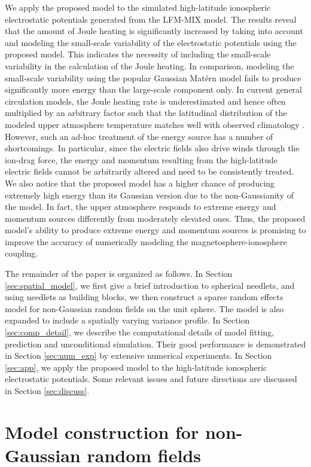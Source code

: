 \documentclass[aoas,preprint]{imsart}
\numberwithin{equation}{section}
\theoremstyle{plain}
\begin{document}
We apply the proposed model to the simulated high-latitude ionospheric electrostatic potentials generated from the LFM-MIX model. The results reveal that the amount of Joule heating is significantly increased by taking into account and modeling the small-scale variability of the electrostatic potentials using the proposed model. This indicates the necessity of including the small-scale variability in the calculation of the Joule heating. In comparison, modeling the small-scale variability using the popular Gaussian Mat\'ern model fails to produce significantly more energy than the large-scale component only. In current general circulation models, the Joule heating rate is underestimated and hence often multiplied by an arbitrary factor such that the latitudinal distribution of the modeled upper atmosphere temperature matches well with observed climatology \citep{Matsuo-08}. However, such an ad-hoc treatment of the energy source has a number of shortcomings. In particular, since the electric fields also drive winds through the ion-drag force, the energy and momentum resulting from the high-latitude electric fields cannot be arbitrarily altered and need to be consistently treated. We also notice that the proposed model has a higher chance of producing extremely high energy than its Gaussian version due to the non-Gaussianity of the model.
In fact, the upper atmosphere responds to extreme energy and momentum sources differently from moderately elevated ones. Thus, the proposed model's ability to produce extreme energy and momentum sources is promising to improve the accuracy of numerically modeling the magnetosphere-ionosphere coupling.
 
The remainder of the paper is organized as follows. In Section \ref{sec:spatial_model}, we first give a brief introduction to spherical needlets, and using needlets as building blocks, we then construct a sparse random effects model for non-Gaussian random fields on the unit sphere. The model is also expanded to include a spatially varying variance profile. In Section \ref{sec:comp_detail}, we describe the computational details of model fitting, prediction and unconditional simulation. Their good performance is demonstrated in Section \ref{sec:num_exp} by extensive numerical experiments. In Section \ref{sec:app}, we apply the proposed model to the high-latitude ionospheric electrostatic potentials. Some relevant issues and future directions are discussed in Section \ref{sec:discuss}.


\section{Model construction for non-Gaussian random fields\label{sec:spatial_model}}
\end{document}
